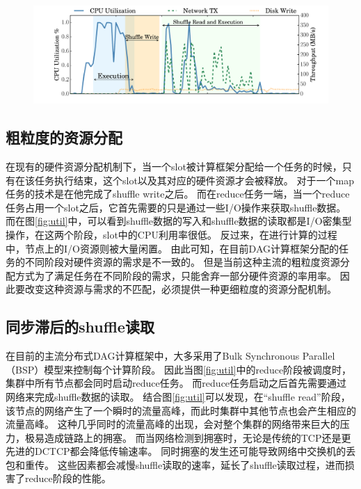 \begin{figure}[!htp]
	\centering
	\includegraphics[width=\textwidth]{../../PPoPP-2018/fig/util.pdf}
\end{figure}

\subsection{粗粒度的资源分配}

在现有的硬件资源分配机制下，当一个slot被计算框架分配给一个任务的时候，只有在该任务执行结束，这个slot以及其对应的硬件资源才会被释放。
对于一个map任务的技术是在他完成了shuffle write之后。
而在reduce任务一端，当一个reduce任务占用一个slot之后，它首先需要的只是通过一些I/O操作来获取shuffle数据。
而在图\ref{fig:util}中，可以看到shuffle数据的写入和shuffle数据的读取都是I/O密集型操作，在这两个阶段，slot中的CPU利用率很低。
反过来，在进行计算的过程中，节点上的I/O资源则被大量闲置。
由此可知，在目前DAG计算框架分配的任务的不同阶段对硬件资源的需求是不一致的。
但是当前这种主流的粗粒度资源分配方式为了满足任务在不同阶段的需求，只能舍弃一部分硬件资源的率用率。
因此要改变这种资源与需求的不匹配，必须提供一种更细粒度的资源分配机制。

\subsection{同步滞后的shuffle读取}

在目前的主流分布式DAG计算框架中，大多采用了Bulk Synchronous Parallel（BSP）模型来控制每个计算阶段。
因此当图\ref{fig:util}中的reduce阶段被调度时，集群中所有节点都会同时启动reduce任务。
而reduce任务启动之后首先需要通过网络来完成shuffle数据的读取。
结合图\ref{fig:util}可以发现，在“shuffle read”阶段，该节点的网络产生了一个瞬时的流量高峰，而此时集群中其他节点也会产生相应的流量高峰。
这种几乎同时的流量高峰的出现，会对整个集群的网络带来巨大的压力，极易造成链路上的拥塞。
而当网络检测到拥塞时，无论是传统的TCP\cite{tcp}还是更先进的DCTCP\cite{dctcp}都会降低传输速率。
同时拥塞的发生还可能导致网络中交换机的丢包和重传。
这些因素都会减慢shuffle读取的速率，延长了shuffle读取过程，进而损害了reduce阶段的性能。

